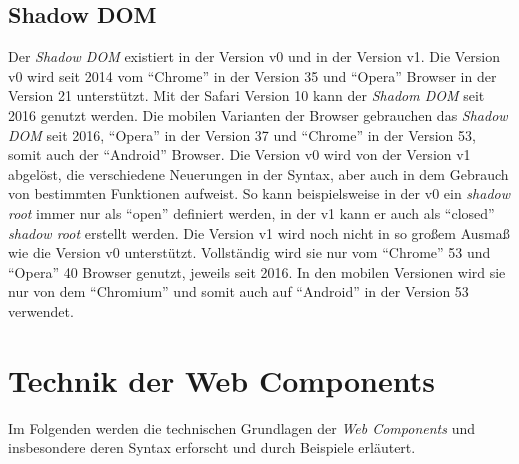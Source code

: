 \documentclass[12pt, paper=a4, bibtotoc, toc=listof, headsepline=true, numbers=endperiod]{scrreprt}
\begin{document}
		\subsection{Shadow DOM}
		Der \emph{Shadow \ac{DOM}} existiert in der Version v0 und in der Version v1. Die Version v0 wird seit 2014 vom \enquote{Chrome} in der Version 35 und \enquote{Opera} Browser in der Version 21 unterstützt. Mit der Safari Version 10 kann der \emph{Shadom \ac{DOM}} seit 2016  genutzt werden\cite{NiwaShaDom}. Die mobilen Varianten der Browser gebrauchen das \emph{Shadow \ac{DOM}} seit 2016, \enquote{Opera} in der Version 37 und \enquote{Chrome} in der Version 53, somit auch der \enquote{Android} Browser\cite{Hayato2016}. Die Version v0 wird von der Version v1 abgelöst, die verschiedene Neuerungen in der Syntax, aber auch in dem Gebrauch von bestimmten Funktionen aufweist. So kann beispielsweise in der v0 ein \emph{shadow root} immer nur als \enquote{open} definiert werden, in der v1 kann er auch als \enquote{closed} \emph{shadow root} erstellt werden\cite{Ito2016}.
		Die Version v1 wird noch nicht in so großem Ausmaß wie die Version v0 unterstützt. Vollständig wird sie nur vom \enquote{Chrome} 53 und \enquote{Opera} 40 Browser genutzt, jeweils seit 2016. In den mobilen Versionen wird sie nur von dem \enquote{Chromium} und somit auch auf \enquote{Android} in der Version 53 verwendet\cite{Hayato2016a}.
	
			
	\section{Technik der Web Components}
	Im Folgenden werden die technischen Grundlagen der \emph{Web Components} und insbesondere deren Syntax erforscht und durch Beispiele erläutert.
\end{document}
